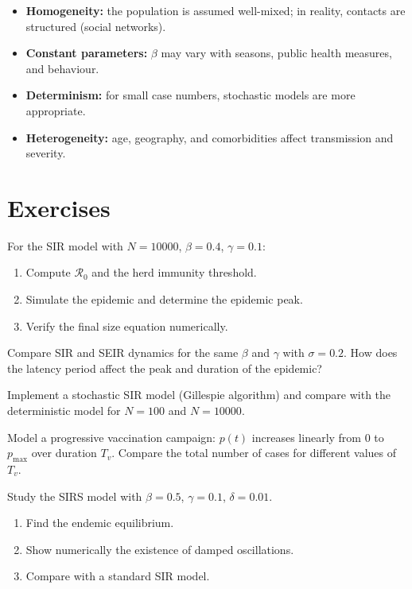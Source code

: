 \begin{warning}[title=\textbf{Key limitations}]
\begin{itemize}
  \item \textbf{Homogeneity:} the population is assumed well-mixed;
    in reality, contacts are structured (social networks).
  \item \textbf{Constant parameters:} $\beta$ may vary with seasons,
    public health measures, and behaviour.
  \item \textbf{Determinism:} for small case numbers, stochastic
    models are more appropriate.
  \item \textbf{Heterogeneity:} age, geography, and comorbidities
    affect transmission and severity.
\end{itemize}
\end{warning}

\section{Exercises}

\begin{exercise}
For the SIR model with $N=10000$, $\beta=0.4$, $\gamma=0.1$:
\begin{enumerate}
  \item Compute $\mathcal{R}_0$ and the herd immunity threshold.
  \item Simulate the epidemic and determine the epidemic peak.
  \item Verify the final size equation numerically.
\end{enumerate}
\end{exercise}

\begin{exercise}
Compare SIR and SEIR dynamics for the same $\beta$ and $\gamma$
with $\sigma=0.2$.  How does the latency period affect the peak
and duration of the epidemic?
\end{exercise}

\begin{exercise}
Implement a stochastic SIR model (Gillespie algorithm) and compare
with the deterministic model for $N=100$ and $N=10000$.
\end{exercise}

\begin{exercise}
Model a progressive vaccination campaign: $p(t)$ increases linearly
from 0 to $p_{\max}$ over duration $T_v$.  Compare the total number
of cases for different values of $T_v$.
\end{exercise}

\begin{exercise}
Study the SIRS model with $\beta=0.5$, $\gamma=0.1$, $\delta=0.01$.
\begin{enumerate}
  \item Find the endemic equilibrium.
  \item Show numerically the existence of damped oscillations.
  \item Compare with a standard SIR model.
\end{enumerate}
\end{exercise}
